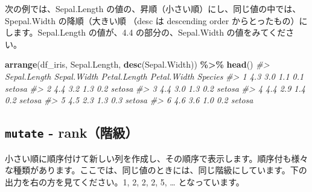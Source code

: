 \documentclass[
  xelatex, ja=standard]{bxjsbook}
\newenvironment{Shaded}{\begin{snugshade}}{\end{snugshade}}
\newcommand{\CommentTok}[1]{\textcolor[rgb]{0.56,0.35,0.01}{\textit{#1}}}
\newcommand{\FunctionTok}[1]{\textcolor[rgb]{0.13,0.29,0.53}{\textbf{#1}}}
\newcommand{\NormalTok}[1]{#1}
\newcommand{\SpecialCharTok}[1]{\textcolor[rgb]{0.81,0.36,0.00}{\textbf{#1}}}
\theoremstyle{definition}
\theoremstyle{definition}
\theoremstyle{definition}
\theoremstyle{definition}
\theoremstyle{remark}
\begin{document}
次の例では、Sepal.Length の値の、昇順（小さい順）にし、同じ値の中では、Spepal.Width の降順（大きい順 （desc は descending order からとったもの）にします。Sepal.Length の値が、4.4 の部分の、Sepal.Width の値をみてください。

\begin{Shaded}
\begin{Highlighting}[]
\FunctionTok{arrange}\NormalTok{(df\_iris, Sepal.Length, }\FunctionTok{desc}\NormalTok{(Sepal.Width)) }\SpecialCharTok{\%\textgreater{}\%} \FunctionTok{head}\NormalTok{()}
\CommentTok{\#\textgreater{}   Sepal.Length Sepal.Width Petal.Length Petal.Width Species}
\CommentTok{\#\textgreater{} 1          4.3         3.0          1.1         0.1  setosa}
\CommentTok{\#\textgreater{} 2          4.4         3.2          1.3         0.2  setosa}
\CommentTok{\#\textgreater{} 3          4.4         3.0          1.3         0.2  setosa}
\CommentTok{\#\textgreater{} 4          4.4         2.9          1.4         0.2  setosa}
\CommentTok{\#\textgreater{} 5          4.5         2.3          1.3         0.3  setosa}
\CommentTok{\#\textgreater{} 6          4.6         3.6          1.0         0.2  setosa}
\end{Highlighting}
\end{Shaded}

\hypertarget{mutate---rankux968eux7d1a}{%
\subsection{\texorpdfstring{\texttt{mutate} - rank（階級）}{mutate - rank（階級）}}\label{mutate---rankux968eux7d1a}}

小さい順に順序付けて新しい列を作成し、その順序で表示します。順序付も様々な種類があります。ここでは、同じ値のときには、同じ階級にしています。下の出力を右の方を見てください。1, 2, 2, 2, 5, \ldots{} となっています。
\end{document}
